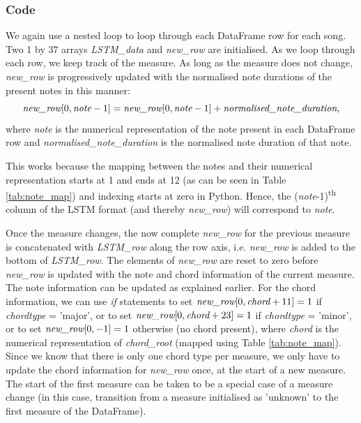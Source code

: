 \subsubsection{Code}
We again use a nested loop to loop through each DataFrame row for each song. Two 1 by 37 arrays \emph{LSTM\_data} and \emph{new\_row} are initialised. As we loop through each row, we keep track of the measure. As long as the measure does not change, \emph{new\_row} is progressively updated with the normalised note durations of the present notes in this manner: 
\begin{equation}  
\emph{new\_row}[0,\emph{note}-1] = \emph{new\_row}[0,\emph{note}-1] + \emph{normalised\_note\_duration},
\end{equation}
where \emph{note} is the numerical representation of the note present in each DataFrame row and \emph{normalised\_note\_duration} is the normalised note duration of that note. 

This works because the mapping between the notes and their numerical representation starts at 1 and ends at 12 (as can be seen in Table \cref{tab:note_map}) and indexing starts at zero in Python. Hence, the (\emph{note}-1)\textsuperscript{th} column of the LSTM format (and thereby \emph{new\_row}) will correspond to \emph{note}.

Once the measure changes, the now complete \emph{new\_row} for the previous measure is concatenated with \emph{LSTM\_row} along the row axis, i.e. \emph{new\_row} is added to the bottom of \emph{LSTM\_row}. The elements of \emph{new\_row} are reset to zero before \emph{new\_row} is updated with the note and chord information of the current measure. The note information can be updated as explained earlier. For the chord information, we can use \emph{if} statements to set $\emph{new\_row}[0, \emph{chord}+11] = 1$ if \emph{chordtype} = 'major', or to set $\emph{new\_row}[0, \emph{chord}+23] = 1$ if \emph{chordtype} = 'minor', or to set $\emph{new\_row}[0, -1] = 1$ otherwise (no chord present), where \emph{chord} is the numerical representation of \emph{chord\_root} (mapped using Table \cref{tab:note_map}). Since we know that there is only one chord type per measure, we only have to update the chord information for \emph{new\_row} once, at the start of a new measure. The start of the first measure can be taken to be a special case of a measure change (in this case, transition from a measure initialised as 'unknown' to the first measure of the DataFrame).

